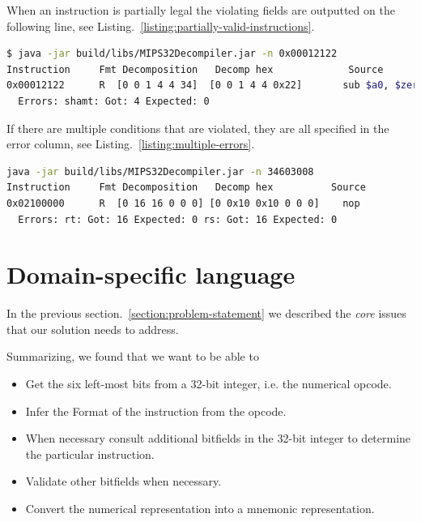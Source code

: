 \documentclass[a4paper]{article}
\begin{document}
When an instruction is partially legal the violating fields are outputted
on the following line, see Listing.~\ref{listing:partially-valid-instructions}.

\begin{minipage}{\linewidth}
\begin{lstlisting}[basicstyle=\small, 
    language=bash, 
    caption=Error print-outs for partially valid instructions,
    label=listing:partially-valid-instructions,
  backgroundcolor=\color{mintedbackground}]
$ java -jar build/libs/MIPS32Decompiler.jar -n 0x00012122
Instruction     Fmt Decomposition   Decomp hex             Source            
0x00012122      R  [0 0 1 4 4 34]  [0 0 1 4 4 0x22]       sub $a0, $zero, $at
  Errors: shamt: Got: 4 Expected: 0
\end{lstlisting}
\end{minipage}

If there are multiple conditions that are violated, they are all
specified in the error column, see Listing.~\ref{listing:multiple-errors}.

\begin{minipage}{\linewidth}
\begin{lstlisting}[basicstyle=\small, 
    language=bash, 
    caption=Multiple errors,
    breaklines=false,
    label=listing:multiple-errors,
  backgroundcolor=\color{mintedbackground}]
java -jar build/libs/MIPS32Decompiler.jar -n 34603008
Instruction     Fmt Decomposition   Decomp hex          Source
0x02100000      R  [0 16 16 0 0 0] [0 0x10 0x10 0 0 0]    nop
  Errors: rt: Got: 16 Expected: 0 rs: Got: 16 Expected: 0
\end{lstlisting}
\end{minipage}

\section{Domain-specific language}

In the previous section.~\ref{section:problem-statement} we described
the \emph{core} issues that our solution needs to address. 

Summarizing, we found that we want to be able to

\begin{itemize}
\item Get the six left-most bits from a 32-bit integer,
  i.e. the numerical opcode.
\item Infer the Format of the instruction from the opcode.
\item When necessary consult additional bitfields in the 32-bit integer to
      determine the particular instruction.
\item Validate other bitfields when necessary.
\item Convert the numerical representation into a mnemonic representation.
\end{itemize}
\end{document}
